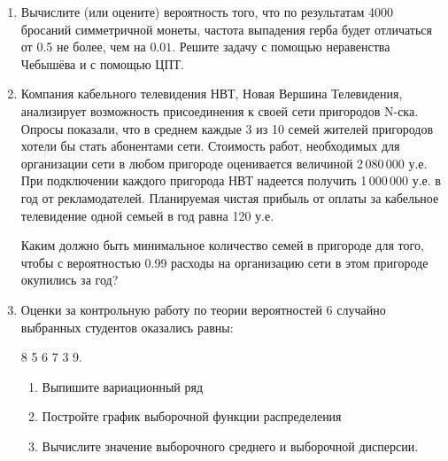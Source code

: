 \documentclass[12pt, a4paper]{article}\usepackage[]{graphicx}\usepackage[]{color}
\begin{document}
\begin{enumerate}
\begin{enumerate}
\end{enumerate}




\item Вычислите (или оцените) вероятность того, что по результатам 4000 бросаний симметричной монеты,  частота выпадения герба будет отличаться от 0.5 не более, чем на $0.01$. Решите задачу с помощью неравенства Чебышёва и с помощью ЦПТ.





\item Компания кабельного телевидения НВТ, Новая Вершина Телевидения, анализирует возможность присоединения к своей сети пригородов N-ска. Опросы показали, что в среднем каждые 3 из 10 семей жителей пригородов хотели бы стать абонентами сети. Стоимость работ, необходимых для организации сети в любом пригороде оценивается величиной 2\,080\,000 у.е. При подключении каждого пригорода НВТ надеется получить 1\,000\,000 у.е. в год от рекламодателей. Планируемая чистая прибыль от оплаты за кабельное телевидение одной семьей в год равна 120 у.е.

Каким должно быть минимальное количество семей в пригороде для того, чтобы с вероятностью 0.99 расходы на организацию сети в этом пригороде окупились за год?


\item Оценки за контрольную работу по теории вероятностей 6 случайно выбранных студентов оказались равны:

8 5 6 7 3 9.

\begin{enumerate}
\item Выпишите вариационный ряд
\item Постройте график выборочной функции распределения
\item Вычислите значение выборочного среднего и выборочной дисперсии.
\end{enumerate}
\end{enumerate}
\end{document}
